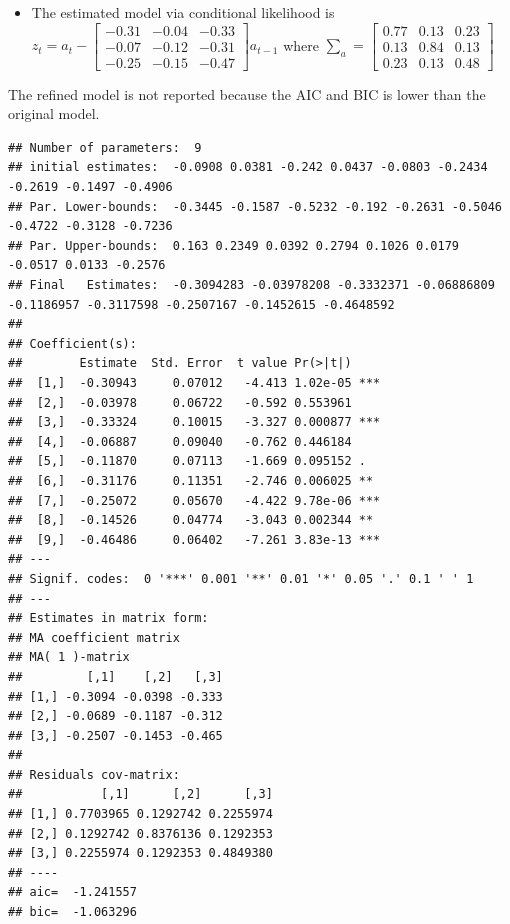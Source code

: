 \documentclass[]{article}
\providecommand{\tightlist}{%
  \setlength{\itemsep}{0pt}\setlength{\parskip}{0pt}}
\begin{document}
\begin{itemize}
\tightlist
\item
  The estimated model via conditional likelihood is
  \(z_{t} = a_{t} - \left[\begin{array}{rrr}-0.31 & -0.04 & -0.33 \\-0.07 & -0.12 & -0.31 \\-0.25 & -0.15 & -0.47\end{array}\right]a_{t-1}\)
  where
  \(\sum_{a} = \left[\begin{array}{rrr}0.77 & 0.13 & 0.23 \\0.13 & 0.84 & 0.13 \\ 0.23 & 0.13 & 0.48\end{array}\right]\)
\end{itemize}

The refined model is not reported because the AIC and BIC is lower than
the original model.

\begin{verbatim}
## Number of parameters:  9 
## initial estimates:  -0.0908 0.0381 -0.242 0.0437 -0.0803 -0.2434 -0.2619 -0.1497 -0.4906 
## Par. Lower-bounds:  -0.3445 -0.1587 -0.5232 -0.192 -0.2631 -0.5046 -0.4722 -0.3128 -0.7236 
## Par. Upper-bounds:  0.163 0.2349 0.0392 0.2794 0.1026 0.0179 -0.0517 0.0133 -0.2576 
## Final   Estimates:  -0.3094283 -0.03978208 -0.3332371 -0.06886809 -0.1186957 -0.3117598 -0.2507167 -0.1452615 -0.4648592 
## 
## Coefficient(s):
##        Estimate  Std. Error  t value Pr(>|t|)    
##  [1,]  -0.30943     0.07012   -4.413 1.02e-05 ***
##  [2,]  -0.03978     0.06722   -0.592 0.553961    
##  [3,]  -0.33324     0.10015   -3.327 0.000877 ***
##  [4,]  -0.06887     0.09040   -0.762 0.446184    
##  [5,]  -0.11870     0.07113   -1.669 0.095152 .  
##  [6,]  -0.31176     0.11351   -2.746 0.006025 ** 
##  [7,]  -0.25072     0.05670   -4.422 9.78e-06 ***
##  [8,]  -0.14526     0.04774   -3.043 0.002344 ** 
##  [9,]  -0.46486     0.06402   -7.261 3.83e-13 ***
## ---
## Signif. codes:  0 '***' 0.001 '**' 0.01 '*' 0.05 '.' 0.1 ' ' 1
## --- 
## Estimates in matrix form: 
## MA coefficient matrix 
## MA( 1 )-matrix 
##         [,1]    [,2]   [,3]
## [1,] -0.3094 -0.0398 -0.333
## [2,] -0.0689 -0.1187 -0.312
## [3,] -0.2507 -0.1453 -0.465
##   
## Residuals cov-matrix: 
##           [,1]      [,2]      [,3]
## [1,] 0.7703965 0.1292742 0.2255974
## [2,] 0.1292742 0.8376136 0.1292353
## [3,] 0.2255974 0.1292353 0.4849380
## ---- 
## aic=  -1.241557 
## bic=  -1.063296
\end{verbatim}
\end{document}
